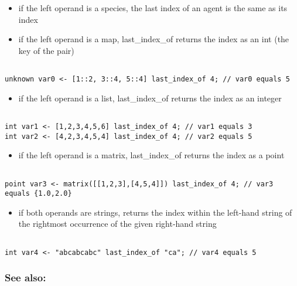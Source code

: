 \documentclass[]{book}
\providecommand{\tightlist}{%
  \setlength{\itemsep}{0pt}\setlength{\parskip}{0pt}}
\theoremstyle{definition}
\theoremstyle{definition}
\theoremstyle{definition}
\theoremstyle{remark}
\begin{document}
\begin{itemize}
\tightlist
\item
  if the left operand is a species, the last index of an agent is the
  same as its index\\
\item
  if the left operand is a map, last\_index\_of returns the index as an
  int (the key of the pair)
\end{itemize}

\begin{verbatim}
 
unknown var0 <- [1::2, 3::4, 5::4] last_index_of 4; // var0 equals 5
\end{verbatim}

\begin{itemize}
\tightlist
\item
  if the left operand is a list, last\_index\_of returns the index as an
  integer
\end{itemize}

\begin{verbatim}
 
int var1 <- [1,2,3,4,5,6] last_index_of 4; // var1 equals 3 
int var2 <- [4,2,3,4,5,4] last_index_of 4; // var2 equals 5
\end{verbatim}

\begin{itemize}
\tightlist
\item
  if the left operand is a matrix, last\_index\_of returns the index as
  a point
\end{itemize}

\begin{verbatim}
 
point var3 <- matrix([[1,2,3],[4,5,4]]) last_index_of 4; // var3 equals {1.0,2.0}
\end{verbatim}

\begin{itemize}
\tightlist
\item
  if both operands are strings, returns the index within the left-hand
  string of the rightmost occurrence of the given right-hand string
\end{itemize}

\begin{verbatim}
 
int var4 <- "abcabcabc" last_index_of "ca"; // var4 equals 5
\end{verbatim}

\subsubsection{See also:}\label{see-also-123}
\end{document}
